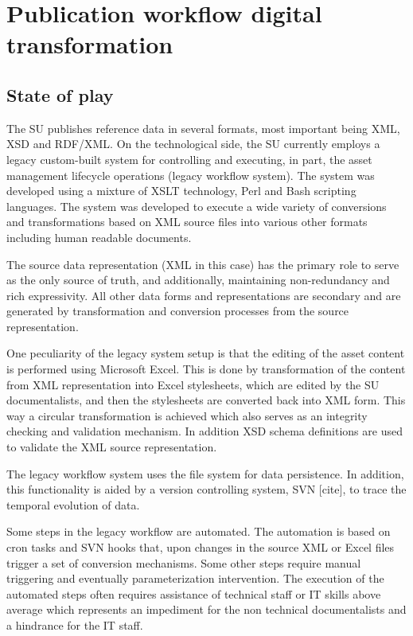 \section{Publication workflow digital transformation}
\label{sec:context}


	\subsection{State of play}
	The SU publishes reference data in several formats, most important being XML, XSD and RDF/XML. On the technological side, the SU currently employs a legacy custom-built system for controlling and executing, in part, the asset management lifecycle operations (legacy workflow system). The system was developed using a mixture of XSLT technology, Perl and Bash scripting languages. The system was developed to execute a wide variety of conversions and transformations based on XML source files into various other formats including human readable documents.
	 
	The source data representation (XML in this case) has the primary role to serve as the only source of truth, and additionally, maintaining non-redundancy and rich expressivity. All other data forms and representations are secondary and are generated by transformation and conversion processes from the source representation.
	 
	One peculiarity of the legacy system setup is that the editing of the asset content is performed using Microsoft Excel. This is done by transformation of the content from XML representation into Excel stylesheets, which are edited by the SU documentalists, and then the stylesheets are converted back into XML form. This way a circular transformation is achieved which also serves as an integrity checking and validation mechanism. In addition XSD schema definitions are used to validate the XML source representation.
	 
	The legacy workflow system uses the file system for data persistence. In addition, this functionality is aided by a version controlling system, SVN [cite], to trace the temporal evolution of data.
	 
	Some steps in the legacy workflow are automated. The automation is based on cron tasks and SVN hooks that, upon changes in the source XML or Excel files trigger a set of conversion mechanisms.  Some other steps require manual triggering and eventually parameterization intervention. The execution of the automated steps often requires assistance of technical staff or IT skills above average which represents an impediment for the non technical documentalists and a hindrance for the IT staff.
	 
